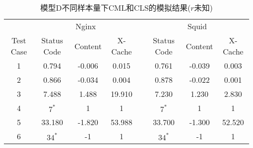 \begin{table}
	\renewcommand\arraystretch{1.1}      %
	\caption{模型D不同样本量下CML和CLS的模拟结果($r$未知)}
	\vspace{1.2mm}                  %
	\centering                            %
	{\tabcolsep  0.09in                    %
		\begin{tabular}{cccccccc}
			\hline
			& \multicolumn{3}{c}{Nginx} & & \multicolumn{3}{c}{Squid}\\
			\cline{2-4}\cline{6-8}
			Test Case & Status Code  & Content  & X-Cache  & &  Status Code  & Content & X-Cache\\
			\hline
			1 &  0.794  &  -0.006  &  0.015  & &  0.761  &  -0.039  &  0.003 \\
			2 &  0.866  &  -0.034  &  0.004  & &  0.878  &  -0.022  &  0.001 \\
			3 &  7.488  &  1.488  &  19.910  & &  7.230  &  1.230  &  2.830 \\
			4 &  $7^\ast$&  1      &  1      & &  $7^\ast$& 1      &  1 \\
		    5 &  33.180 &  -1.820  &  53.988  & &  33.700 &  -1.300  &  52.520 \\
			6 &  $34^\ast$&  -1    &  1      & &  $34^\ast$&-1      &  1 \\
			\hline
		\end{tabular}
	}
\end{table}

